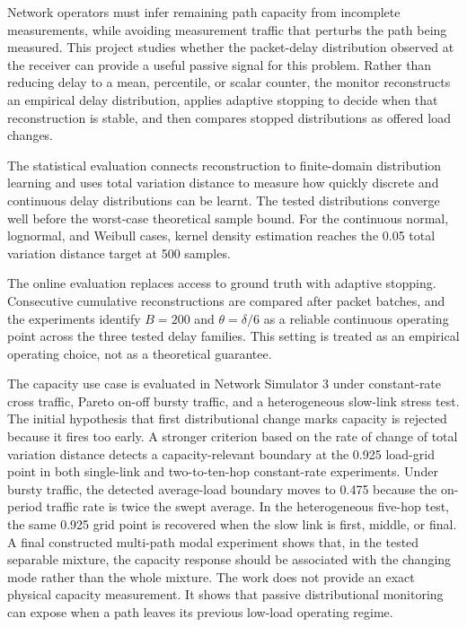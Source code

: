 Network operators must infer remaining path capacity from incomplete measurements, while avoiding measurement traffic that perturbs the path being measured. This project studies whether the packet-delay distribution observed at the receiver can provide a useful passive signal for this problem. Rather than reducing delay to a mean, percentile, or scalar counter, the monitor reconstructs an empirical delay distribution, applies adaptive stopping to decide when that reconstruction is stable, and then compares stopped distributions as offered load changes.

The statistical evaluation connects reconstruction to finite-domain distribution learning and uses total variation distance to measure how quickly discrete and continuous delay distributions can be learnt. The tested distributions converge well before the worst-case theoretical sample bound. For the continuous normal, lognormal, and Weibull cases, kernel density estimation reaches the 0.05 total variation distance target at 500 samples.

The online evaluation replaces access to ground truth with adaptive stopping. Consecutive cumulative reconstructions are compared after packet batches, and the experiments identify \(B=200\) and \(\theta=\delta/6\) as a reliable continuous operating point across the three tested delay families. This setting is treated as an empirical operating choice, not as a theoretical guarantee.

The capacity use case is evaluated in Network Simulator 3 under constant-rate cross traffic, Pareto on-off bursty traffic, and a heterogeneous slow-link stress test. The initial hypothesis that first distributional change marks capacity is rejected because it fires too early. A stronger criterion based on the rate of change of total variation distance detects a capacity-relevant boundary at the 0.925 load-grid point in both single-link and two-to-ten-hop constant-rate experiments. Under bursty traffic, the detected average-load boundary moves to 0.475 because the on-period traffic rate is twice the swept average. In the heterogeneous five-hop test, the same 0.925 grid point is recovered when the slow link is first, middle, or final. A final constructed multi-path modal experiment shows that, in the tested separable mixture, the capacity response should be associated with the changing mode rather than the whole mixture. The work does not provide an exact physical capacity measurement. It shows that passive distributional monitoring can expose when a path leaves its previous low-load operating regime.
